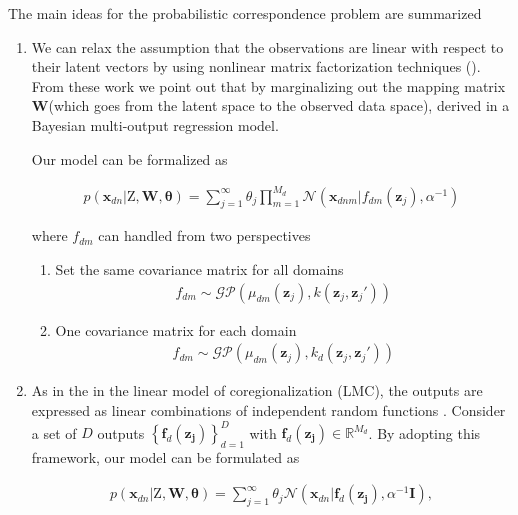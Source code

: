 \documentclass[]{article}
\newcommand{\gD}[2]{\mathcal{N}\left(#1,#2\right)}
\newcommand{\kernel}[2]{k\left(#1,#2\right)}
\newcommand{\Z}{\boldsymbol{\mathrm{Z}}}
\newcommand{\eye}{\mathbf{I}}
\newcommand{\indobj}{\mathbf{x}_{dn}}
\newcommand{\lvecI}{\mathbf{z}_j}
\newcommand{\GP}[2]{\mathcal{GP}\left(#1,#2\right)}
\begin{document}
The main ideas for the probabilistic correspondence problem are summarized

\begin{enumerate}
	\item We can relax the assumption that the observations are linear with respect to their latent vectors by using nonlinear matrix factorization techniques (\cite{Lawrence09NMF}). From these work we point out that by marginalizing out the mapping matrix $\mathbf{W}$(which goes
	from the latent space to the observed data space), derived in a Bayesian multi-output regression model. 
	
	Our model can be formalized as
	
	\begin{align}
	p\left( {{\indobj}|{\Z},{\mathbf{{W}}},{\boldsymbol{\theta }}} \right) = \sum_{j=1}^{\infty} \theta_{j}{\prod_{m=1}^{M_d}\gD{\mathbf{x}_{dnm}|f_{dm}\left(\lvecI\right)}{\alpha^{-1}}}
	\end{align}
	
	where $f_{dm}$ can handled from two perspectives
	\begin{enumerate}
		\item Set the same covariance matrix for all domains
		\begin{align}
		f_{dm} \sim \GP{\mu_{dm}\left(\lvecI\right)}{\kernel{\lvecI}{\lvecI'}}
		\end{align}
		
		\item One covariance matrix for each domain
		\begin{align}
		f_{dm} \sim \GP{\mu_{dm}\left(\lvecI\right)}{k_d\left({\lvecI},{\lvecI'}\right)}
		\end{align}
	\end{enumerate}
	
	\item As in the in the linear model of coregionalization (LMC), the outputs are expressed as linear combinations
	of independent random functions \cite{Alvarez12KVF}. Consider a set of $D$ outputs $\left\{\mathbf{f}_d(\mathbf{\lvecI})\right\}_{d=1}^D$
    with $\mathbf{f}_d(\mathbf{\lvecI}) \in \mathbb{R}^{M_d}$. By adopting this framework, our model can be formulated as
    
    \begin{align}
    p\left( {{\indobj}|{\Z},{\mathbf{{W}}},{\boldsymbol{\theta }}} \right) = \sum_{j=1}^{\infty} \theta_j \gD{\indobj|\mathbf{f}_{d}(\mathbf{\lvecI})}{\alpha^{-1}\eye},
    \end{align}
    

\end{enumerate}
\end{document}

